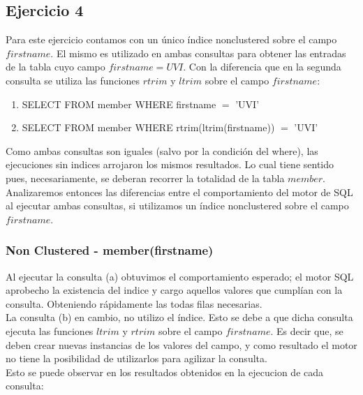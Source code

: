\subsection{Ejercicio 4}

Para este ejercicio contamos con un único índice nonclustered sobre el campo $firstname$. El mismo es utilizado en ambas 
consultas para obtener las entradas de la tabla cuyo campo $firstname=UVI$. Con la diferencia que en la segunda consulta se 
utiliza las funciones $rtrim$ y $ltrim$ sobre el campo $firstname$:  
\begin{enumerate}[label=(\alph*)]
\item{SELECT \* FROM member WHERE firstname $=$ 'UVI'}

\item{SELECT \* FROM member WHERE rtrim(ltrim(firstname)) $=$ 'UVI'}

\end{enumerate}

Como ambas consultas son iguales (salvo por la condición del where), las ejecuciones sin indices arrojaron los mismos
resultados. Lo cual tiene sentido pues, necesariamente, se deberan recorrer la totalidad de la tabla $member$.\\

Analizaremos entonces las diferencias entre el comportamiento del motor de SQL al ejecutar ambas consultas, si utilizamos 
un índice nonclustered sobre el campo $firstname$.\\ 

\subsubsection{Non Clustered - member(firstname)}

Al ejecutar la consulta (a) obtuvimos el comportamiento esperado; el motor SQL aprobecho la existencia del indice y cargo 
aquellos valores que cumplían con la consulta. Obteniendo rápidamente las todas filas necesarias. \\%

La consulta (b) en cambio, no utilizo el índice. Esto se debe a que dicha consulta ejecuta las funciones $ltrim$ y $rtrim$ 
sobre el campo $firstname$. Es decir que, se deben crear nuevas instancias de los valores del campo, y como resultado 
el motor no tiene la posibilidad de utilizarlos para agilizar la consulta.\\%

Esto se  puede observar en los resultados obtenidos en la ejecucion de cada consulta:

